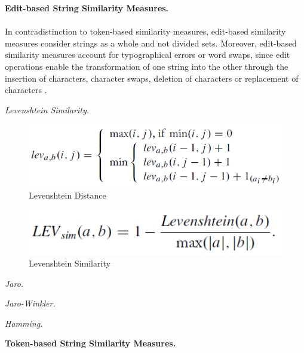 \textbf{Edit-based String Similarity Measures.} \\
\\
In contradistinction to token-based similarity measures, edit-based similarity measures consider strings as a whole and not divided sets. Moreover, edit-based similarity measures account for typographical errors or word swaps, since edit operations enable the transformation of one string into the other through the insertion of characters, character swaps, deletion of characters or replacement of characters \cite{Naumann2010AnIT-P30-34}.

\textit{Levenshtein Similarity.}

\begin{figure}
	\begin{center}
	\includegraphics[width=13cm]{./figures/LevenshteinDistance.PNG}
	\caption[Levenshtein Distance]{Levenshtein Distance \cite{VassilisChristophides2015EntityRI-P25-28}}
	\label{fig:Levenshtein Distance}
	\end{center}
\end{figure}

\begin{figure}
	\begin{center}
	\includegraphics[width=13cm]{./figures/LevenshteinSimilarity.PNG}
	\caption[Levenshtein Similarity]{Levenshtein Similarity \cite{VassilisChristophides2015EntityRI-P25-28}}
	\label{fig:Levenshtein Similarity}
	\end{center}
\end{figure}

\textit{Jaro.}

\textit{Jaro-Winkler.}

\textit{Hamming.}

\textbf{Token-based String Similarity Measures.}

